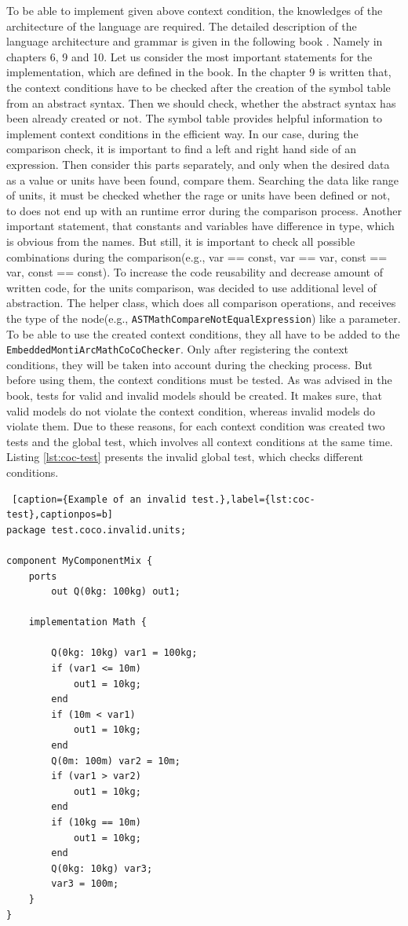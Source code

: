 To be able to implement given above context condition, the knowledges of the architecture of the language are required. The detailed description of the language architecture and grammar is given in the following book \cite{HR17}. Namely in chapters 6, 9 and 10. Let us consider the most important statements for the implementation, which are defined in the book. In the chapter 9 is written that, the context conditions have to be checked after the creation of the symbol table from an abstract syntax. Then we should check, whether the abstract syntax has been already created or not. The symbol table provides helpful information to implement context conditions in the efficient way. In our case, during the comparison check, it is important to find a left and right hand side of an expression. Then consider this parts separately, and only when the desired data as a value or units have been found, compare them. Searching the data like range of units, it must be checked whether the rage or units have been defined or not, to does not end up with an runtime error during the comparison process. Another important statement, that constants and variables have difference in type, which is obvious from the names. But still, it is important to check all possible combinations during the comparison(e.g., var == const, var == var, const == var, const == const). To increase the code reusability and decrease amount of written code, for the units comparison, was decided to use additional level of abstraction. The helper class, which does all comparison operations, and receives the type of the node(e.g., \texttt{ASTMathCompareNotEqualExpression}) like a parameter. \newline
To be able to use the created context conditions, they all have to be added to the \texttt{EmbeddedMontiArcMathCoCoChecker}. Only after registering the context conditions, they will be taken into account during the checking process. But before using them, the context conditions must be tested. As was advised in the book, tests for valid and invalid models should be created. It makes sure, that valid models do not violate the context condition, whereas invalid models do violate them. Due to these reasons, for each context condition was created two tests and the global test, which involves all context conditions at the same time. Listing \ref{lst:coc-test} presents the invalid global test, which checks different conditions.
\bigskip
\begin{lstlisting} [caption={Example of an invalid test.},label={lst:coc-test},captionpos=b]
package test.coco.invalid.units;

component MyComponentMix {
    ports
        out Q(0kg: 100kg) out1;

    implementation Math {

        Q(0kg: 10kg) var1 = 100kg;
        if (var1 <= 10m)              
            out1 = 10kg;
        end
        if (10m < var1)
            out1 = 10kg;
        end
        Q(0m: 100m) var2 = 10m;
        if (var1 > var2)
            out1 = 10kg;
        end
        if (10kg == 10m)
            out1 = 10kg;
        end
        Q(0kg: 10kg) var3;
        var3 = 100m;
    }
}
\end{lstlisting}
